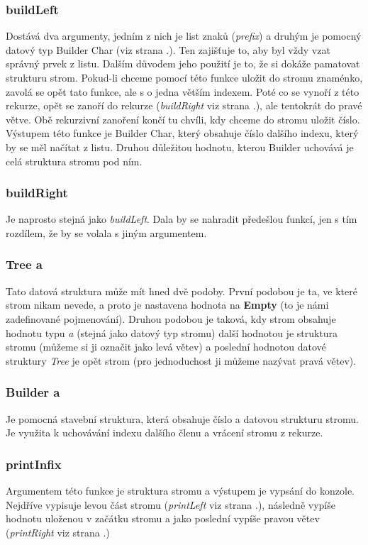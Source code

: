 \documentclass[12pt,a4paper]{report}
\begin{document}
\subsubsection{buildLeft} \label{buildLeft}
Dostává dva argumenty, jedním z nich je list znaků (\textit{prefix}) a druhým je pomocný datový typ Builder Char (viz strana \pageref{Builder}.). Ten zajišťuje to, aby byl vždy vzat správný prvek z listu. Dalším důvodem jeho použití je to, že si dokáže pamatovat strukturu strom. Pokud-li chceme pomocí této funkce uložit do stromu znaménko, zavolá se opět tato funkce, ale s o jedna větším indexem. Poté co se vynoří z této rekurze, opět se zanoří do rekurze (\textit{buildRight} viz strana \pageref{buildRight}.), ale tentokrát do pravé větve. Obě rekurzivní zanoření končí tu chvíli, kdy chceme do stromu uložit číslo. 
Výstupem této funkce je Builder Char, který obsahuje číslo dalšího indexu, který by se měl načítat z listu. Druhou důležitou hodnotu, kterou Builder uchovává je celá struktura stromu pod ním.   
\subsubsection{buildRight} \label{buildRight}
Je naprosto stejná jako \textit{buildLeft}. Dala by se nahradit předešlou funkcí, jen s tím rozdílem, že by se volala s jiným argumentem. 
\subsubsection{Tree a}
Tato datová struktura může mít hned dvě podoby. První podobou je ta, ve které strom nikam nevede, a proto je nastavena hodnota na \textbf{Empty} (to je námi zadefinované pojmenování). Druhou podobou je taková, kdy strom obsahuje hodnotu typu \textit{a} (stejná jako datový typ stromu) další hodnotou je struktura stromu (můžeme si ji označit jako levá větev) a poslední hodnotou datové struktury \textit{Tree} je opět strom (pro jednoduchost ji můžeme nazývat pravá větev).

\subsubsection{Builder a} \label{Builder}
Je pomocná stavební struktura, která obsahuje číslo a datovou strukturu stromu. Je využita k uchovávání indexu dalšího členu a vrácení stromu z rekurze.
\subsubsection{printInfix} \label{printInfix} 
Argumentem této funkce je struktura stromu a výstupem je vypsání do konzole. Nejdříve vypisuje levou část stromu (\textit{printLeft} viz strana \pageref{printLeft}.), následně vypíše hodnotu uloženou v začátku stromu a jako poslední vypíše pravou větev (\textit{printRight} viz strana \pageref{printRight}.)
\end{document}
